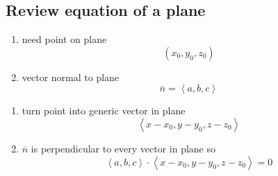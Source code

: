 \subsection{Review equation of a plane}%
\label{sub:review_equation_of_a_plane}

\begin{enumerate}
	\item need point on plane \[(x_0,y_0,z_0)\]
		\item vector normal to plane \[\overline{n} = \left<a, b, c \right>\]
\end{enumerate}

\begin{enumerate}
	\item turn point into generic vector in plane \[\left< x-x_0, y-y_0, z-z_0 \right>\]
		\item $\overline{n}$ is perpendicular to every vector in plane so \[
			\left<a, b, c \right> \cdot \left<x-x_0, y-y_0, z-z_0 \right> = 0\]
\end{enumerate}

\newpage


